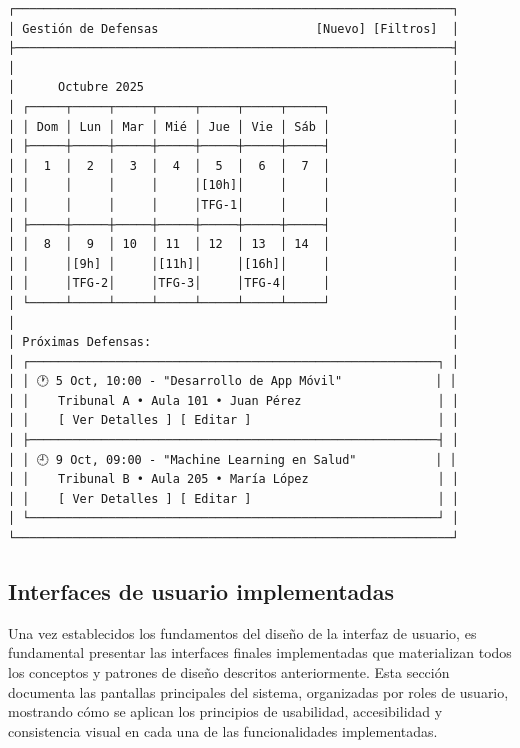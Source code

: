 \documentclass[12pt,a4paper,oneside]{report}
\begin{document}
\begin{lstlisting}
┌─────────────────────────────────────────────────────────────┐
│ Gestión de Defensas                      [Nuevo] [Filtros]  │
├─────────────────────────────────────────────────────────────┤
│                                                             │
│      Octubre 2025                                           │
│ ┌─────┬─────┬─────┬─────┬─────┬─────┬─────┐                 │
│ │ Dom │ Lun │ Mar │ Mié │ Jue │ Vie │ Sáb │                 │
│ ├─────┼─────┼─────┼─────┼─────┼─────┼─────┤                 │
│ │  1  │  2  │  3  │  4  │  5  │  6  │  7  │                 │
│ │     │     │     │     │[10h]│     │     │                 │
│ │     │     │     │     │TFG-1│     │     │                 │
│ ├─────┼─────┼─────┼─────┼─────┼─────┼─────┤                 │
│ │  8  │  9  │ 10  │ 11  │ 12  │ 13  │ 14  │                 │
│ │     │[9h] │     │[11h]│     │[16h]│     │                 │
│ │     │TFG-2│     │TFG-3│     │TFG-4│     │                 │
│ └─────┴─────┴─────┴─────┴─────┴─────┴─────┘                 │
│                                                             │
│ Próximas Defensas:                                          │
│ ┌─────────────────────────────────────────────────────────┐ │
│ │ 🕐 5 Oct, 10:00 - "Desarrollo de App Móvil"             │ │
│ │    Tribunal A • Aula 101 • Juan Pérez                   │ │
│ │    [ Ver Detalles ] [ Editar ]                          │ │
│ ├─────────────────────────────────────────────────────────┤ │
│ │ 🕘 9 Oct, 09:00 - "Machine Learning en Salud"           │ │
│ │    Tribunal B • Aula 205 • María López                  │ │
│ │    [ Ver Detalles ] [ Editar ]                          │ │
│ └─────────────────────────────────────────────────────────┘ │
└─────────────────────────────────────────────────────────────┘
\end{lstlisting}

\subsection{Interfaces de usuario implementadas}\label{interfaces-de-usuario-implementadas}

Una vez establecidos los fundamentos del diseño de la interfaz de usuario, es fundamental presentar las interfaces finales implementadas que materializan todos los conceptos y patrones de diseño descritos anteriormente. Esta sección documenta las pantallas principales del sistema, organizadas por roles de usuario, mostrando cómo se aplican los principios de usabilidad, accesibilidad y consistencia visual en cada una de las funcionalidades implementadas.
\end{document}
